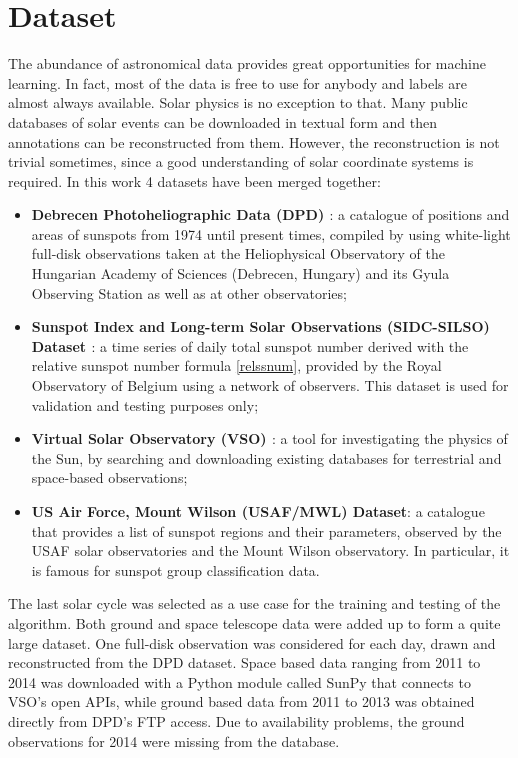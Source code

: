 \chapter{Dataset}
\label{capitolo6}
\thispagestyle{empty}
\noindent The abundance of astronomical data provides great opportunities for machine learning. In fact, most of the data is free to use for anybody and labels are almost always available. Solar physics is no exception to that. Many public databases of solar events can be downloaded in textual form and then annotations can be reconstructed from them. However, the reconstruction is not trivial sometimes, since a good understanding of solar coordinate systems is required. In this work 4 datasets have been merged together:
\begin{itemize}
  \item \textbf{Debrecen Photoheliographic Data (DPD) \cite{baranyi2016line}\cite{gyHori2016comparative}}: a catalogue of positions and areas of sunspots from 1974 until present times, compiled by using white-light full-disk observations taken at the Heliophysical Observatory of the Hungarian Academy of Sciences (Debrecen, Hungary) and its Gyula Observing Station as well as at other observatories;
  \item \textbf{Sunspot Index and Long-term Solar Observations (SIDC-SILSO) Dataset \cite{clette2014revisiting}}: a time series of daily total sunspot number derived with the relative sunspot number formula \eqref{relssnum}, provided by the Royal Observatory of Belgium using a network of observers. This dataset is used for validation and testing purposes only;
  \item \textbf{Virtual Solar Observatory (VSO) \cite{hill2009virtual}}: a tool for investigating the physics of the Sun, by searching and downloading existing databases for terrestrial and space-based observations;
  \item \textbf{US Air Force, Mount Wilson (USAF/MWL) Dataset}: a catalogue that provides a list of sunspot regions and their parameters, observed by the USAF solar observatories and the Mount Wilson observatory. In particular, it is famous for sunspot group classification data.
\end{itemize}
\bigbreak
\noindent The last solar cycle was selected as a use case for the training and testing of the algorithm. Both ground and space telescope data were added up to form a quite large dataset. One full-disk observation was considered for each day, drawn and reconstructed from the DPD dataset. Space based data ranging from 2011 to 2014 was downloaded with a Python module called SunPy \cite{mumford2015sunpy} that connects to VSO's open APIs, while ground based data from 2011 to 2013 was obtained directly from DPD's FTP access. Due to availability problems, the ground observations for 2014 were missing from the database.

